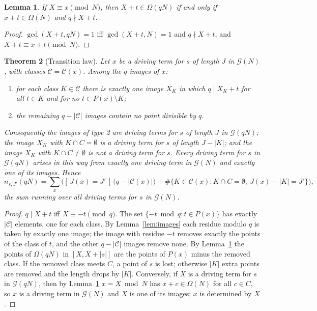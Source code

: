 \documentclass[11pt]{article}
\newtheorem{theorem}{Theorem}[section]
\newtheorem{lemma}[theorem]{Lemma}
\theoremstyle{definition}
\theoremstyle{remark}
\newcommand{\G}{\mathcal{G}}
\newcommand{\C}{\mathcal{C}}
\begin{document}
\begin{lemma}\label{lem:survival}
If $X \equiv x \pmod N$, then $X + t \in \Omega(qN)$ if and only if $x + t \in \Omega(N)$ and $q \nmid X + t$.
\end{lemma}

\begin{proof}
$\gcd(X+t, qN) = 1$ iff $\gcd(X+t, N) = 1$ and $q \nmid X+t$, and $X + t \equiv x + t \pmod N$.
\end{proof}

\begin{theorem}[Transition law]\label{thm:transition}
Let $x$ be a driving term for $s$ of length $J$ in $\G(N)$, with classes $\C = \C(x)$. Among the $q$ images of $x$:
\begin{enumerate}
\item for each class $K \in \C$ there is exactly one image $X_K$ in which $q \mid X_K + t$ for all $t \in K$ and for no $t \in P(x) \setminus K$;
\item the remaining $q - |\C|$ images contain no point divisible by $q$.
\end{enumerate}
Consequently the images of type 2 are driving terms for $s$ of length $J$ in $\G(qN)$; the image $X_K$ with $K \cap C = \emptyset$ is a driving term for $s$ of length $J - |K|$; and the image $X_K$ with $K \cap C \ne \emptyset$ is not a driving term for $s$. Every driving term for $s$ in $\G(qN)$ arises in this way from exactly one driving term in $\G(N)$ and exactly one of its images. Hence
\begin{equation}\label{eq:transition}
  n_{s,J'}(qN) = \sum_{x} \Big( [\,J(x) = J'\,]\,\big(q - |\C(x)|\big) + \#\{ K \in \C(x) : K \cap C = \emptyset,\ J(x) - |K| = J' \} \Big),
\end{equation}
the sum running over all driving terms for $s$ in $\G(N)$.
\end{theorem}

\begin{proof}
$q \mid X + t$ iff $X \equiv -t \pmod q$. The set $\{-t \bmod q : t \in P(x)\}$ has exactly $|\C|$ elements, one for each class. By Lemma~\ref{lem:images} each residue modulo $q$ is taken by exactly one image; the image with residue $-t$ removes exactly the points of the class of $t$, and the other $q - |\C|$ images remove none. By Lemma~\ref{lem:survival} the points of $\Omega(qN)$ in $[X, X + |s|]$ are the points of $P(x)$ minus the removed class. If the removed class meets $C$, a point of $s$ is lost; otherwise $|K|$ extra points are removed and the length drops by $|K|$. Conversely, if $X$ is a driving term for $s$ in $\G(qN)$, then by Lemma~\ref{lem:survival} $x = X \bmod N$ has $x + c \in \Omega(N)$ for all $c \in C$, so $x$ is a driving term in $\G(N)$ and $X$ is one of its images; $x$ is determined by $X$.
\end{proof}
\end{document}
